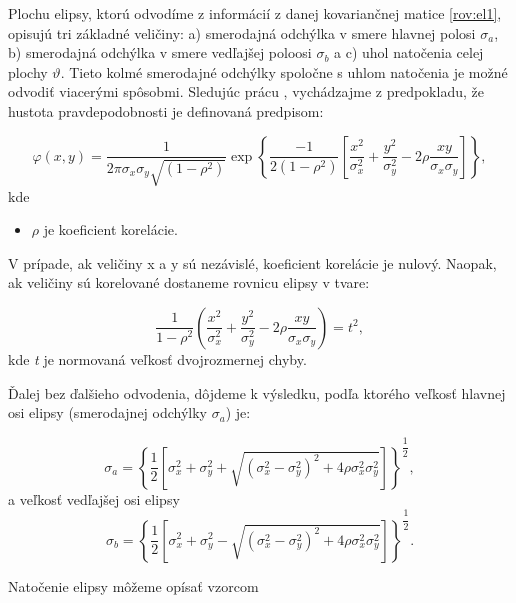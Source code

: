Plochu elipsy, ktorú odvodíme z informácií z danej kovariančnej matice \ref{rov:el1}, opisujú tri základné veličiny: a) smerodajná odchýlka v smere hlavnej polosi $\sigma_a$, b) smerodajná odchýlka v smere vedľajšej poloosi $\sigma_b$ a c) uhol natočenia celej plochy $\vartheta$. Tieto kolmé smerodajné odchýlky spoločne s uhlom natočenia je možné odvodiť viacerými spôsobmi. Sledujúc prácu \cite{Hampacher2003}, vychádzajme z predpokladu, že hustota pravdepodobnosti je definovaná predpisom:

\begin{equation}
\varphi(x, y) = \dfrac{1}{2 \pi \sigma_{x} \sigma_{y} \sqrt{(1-\rho^2)} }  \exp\left\lbrace \dfrac{-1}{2 \left( 1- \rho^2 \right)} \left[ \frac{x^2}{\sigma_{x}^{2}} + \frac{y^2}{\sigma_{y}^{2}} -2 \rho \frac{xy}{\sigma_{x} \sigma_{y}} \right] \right\rbrace,
\end{equation}
kde

\begin{itemize}
\item  $\rho$ je koeficient korelácie.
\end{itemize}
V prípade, ak veličiny x a y sú nezávislé, koeficient korelácie je nulový. Naopak, ak veličiny sú korelované dostaneme rovnicu elipsy v tvare:

\begin{equation}\label{rov:oko}
 \dfrac{1}{1-\rho^2} \left( \dfrac{x^2}{\sigma_{x}^{2}} + \dfrac{y^2}{\sigma_{y}^{2}} -2 \rho \frac{xy}{\sigma_{x} \sigma_{y}} \right)  = t^2,
\end{equation}
kde \textit{t} je normovaná veľkosť dvojrozmernej chyby.

Ďalej bez ďalšieho odvodenia, dôjdeme k výsledku, podľa ktorého veľkosť hlavnej osi elipsy (smerodajnej odchýlky $\sigma_a$) je:

\begin{equation}\label{rov:sigA}
\sigma_a = \left\lbrace \dfrac{1}{2} \left[ \sigma_x^2 + \sigma_y^2 + \sqrt{\left(\sigma_{x}^{2}-\sigma_{y}^{2}\right)^2 + 4\rho\sigma_{x}^2\sigma_{y}^2} \right]\right\rbrace^{\dfrac{1}{2}},
\end{equation}
a veľkosť vedľajšej osi elipsy
\begin{equation}\label{rov:sigB}
\sigma_b = \left\lbrace \dfrac{1}{2} \left[ \sigma_x^2 + \sigma_y^2 - \sqrt{\left(\sigma_{x}^{2}-\sigma_{y}^{2}\right)^2 + 4\rho\sigma_{x}^2\sigma_{y}^2} \right]\right\rbrace^{\dfrac{1}{2}}.
\end{equation}

Natočenie elipsy môžeme opísať vzorcom

